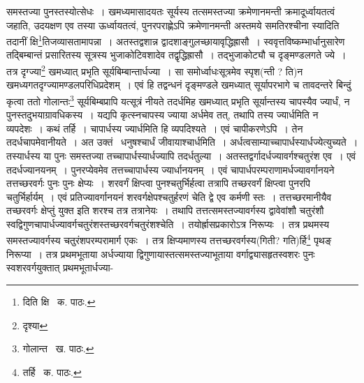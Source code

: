 \documentclass[11pt, openany]{book}
\begin{document}
\noindent समस्तज्या पुनस्तस्योत्सेधः~। खमध्यमासादयतः सूर्यस्य तत्समस्तज्या क्रमेणानमन्ती क्रमादूर्ध्वायतत्वं जहाति, उदयक्षण एव तस्या ऊर्ध्वायतत्वं, पुनरपराह्णेऽपि क्रमेणानमन्ती अस्तमये समतिरश्चीना स्यादिति तदानीं क्षि\renewcommand{\thefootnote}{१}\footnote{दिति क्षि \textendash\ क. पाठः.}तिजव्यासतामापन्ना~। अतस्तद्वशान्न द्वादशाङ्गुलच्छायावृद्धिह्रासौ~। स्ववृत्तविष्कम्भार्धानुसारेण तद्बिम्बान्तं प्रसारितस्य सूत्रस्य भुजाकोटिवशादेव तद्वृद्धिह्रासौ~। तद्भुजाकोट्यौ च दृङ्मण्डलगते ज्ये~। तत्र दृग्ज्या\renewcommand{\thefootnote}{२}\footnote{दृश्या} खमध्यात् प्रभृति सूर्यबिम्बान्तार्धज्या~। सा समोर्ध्वाधःसूत्रमेव स्पृश(न्ती ? ति)न खमध्यगतदृग्ज्यामण्डलपरिधिप्रदेशम्~। एवं हि तद्वन्धनं दृङ्मण्डले खमध्यात् सूर्यापरभागे च तावदन्तरे बिन्दुं कृत्वा ततो गोलान्तः\renewcommand{\thefootnote}{३}\footnote{गोलान्त \textendash\ ख. पाठः.} सूर्यबिम्बप्रापि यत्सूत्रं नीयते तदर्धमिह खमध्यात् प्रभृति सूर्यान्तस्य चापस्यैव ज्यार्धं, न पुनस्तदुभयाग्रावधिकस्य~। यद्यपि कृत्स्नचापस्य ज्याया अर्धमेव तत्, तथापि तस्य ज्यार्धमिति न व्यपदेशः~। कथं तर्हि~। चापार्धस्य ज्यार्धमिति हि व्यपदिश्यते~। एवं चापीकरणेऽपि~। तेन तदर्धचापमेवानीयते~। अत उक्तं \textendash\ {\qt धनुषश्चार्धं जीवायाश्चार्ध}मिति~। अर्धत्वसाम्याच्चापार्धस्यार्धज्येत्युच्यते~। तस्यार्धस्य या पुनः समस्तज्या तच्चापार्धस्यार्धज्यापि तदर्धतुल्या~। अतस्तद्वर्गादर्धज्यावर्गश्चतुरंश एव~। एवं तदर्धज्यानयनम्~। पुनरप्येवमेव तत्तच्चापार्धस्य ज्यार्धानयनम्~। एवं चापार्धपरम्पराणामर्धज्यावर्गानयने तत्तच्छरवर्गः पुनः पुनः क्षेप्यः~। शरवर्गं क्षिप्त्वा पुनश्चतुर्भिर्हत्वा तत्रापि तच्छरवर्गं क्षिप्त्वा पुनरपि चतुर्भिर्हार्यम्~। एवं प्रतिज्यावर्गानयनं शरवर्गक्षेपश्चतुर्हरणं चेति द्वे एव कर्मणी स्तः~। तत्तच्छरमानीयैव तच्छरवर्गः क्षेप्तुं युक्त इति शरश्च तत्र तत्रानेयः~। तथापि तत्तत्समस्तज्यावर्गस्य द्वावेवांशौ चतुरंशौ स्वद्विगुणचापार्धज्यावर्गचतुरंशस्तच्छरवर्गचतुरंशश्चेति~। तयोर्ह्रासप्रकारोऽत्र निरूप्यः~। तत्र प्रथमस्य समस्तज्यावर्गस्य चतुरंशपरम्परामार्ग एकः~। तत्र क्षिप्यमाणस्य तत्तच्छरवर्गस्य(गिती? गति)र्हि\renewcommand{\thefootnote}{४}\footnote{तर्हि \textendash\ क. पाठः.} पृथङ् निरूप्या~। तत्र प्रथमभूताया अर्धज्याया द्विगुणायास्तत्समस्तज्याभूताया वर्गाद्व्यासहृतस्वशरः पुनः स्वशरवर्गयुक्तात् प्रथमभूतार्धज्या-

\newpage
\end{document}
